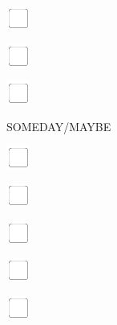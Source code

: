 \documentclass[11pt,titlepage]{article}
\begin{document}
\vspace{10mm}

\noindent
\includegraphics[]{checkbox-4mm.pdf}

\vspace{10mm}

\noindent
\includegraphics[]{checkbox-4mm.pdf}

\vspace{10mm}

\noindent
\includegraphics[]{checkbox-4mm.pdf}

\pagebreak

\small
\hfill SOMEDAY/MAYBE

\vspace{6mm}

\noindent
\includegraphics[]{checkbox-4mm.pdf}

\vspace{10mm}

\noindent
\includegraphics[]{checkbox-4mm.pdf}

\vspace{10mm}

\noindent
\includegraphics[]{checkbox-4mm.pdf}

\vspace{10mm}

\noindent
\includegraphics[]{checkbox-4mm.pdf}

\vspace{10mm}

\noindent
\includegraphics[]{checkbox-4mm.pdf}
\end{document}

